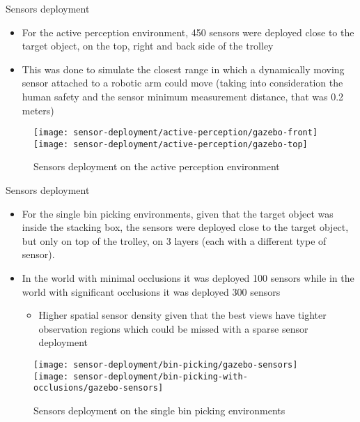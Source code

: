 \begin{frame}{Sensors deployment}
	\begin{itemize}
		\item For the active perception environment, 450 sensors were deployed close to the target object, on the top, right and back side of the trolley
		\item This was done to simulate the closest range in which a dynamically moving sensor attached to a robotic arm could move (taking into consideration the human safety and the sensor minimum measurement distance, that was 0.2 meters)
	\end{itemize}
	\begin{figure}
		\centering
		\texttt{[image: sensor-deployment/active-perception/gazebo-front]}
		\texttt{[image: sensor-deployment/active-perception/gazebo-top]}
		\caption{Sensors deployment on the active perception environment}
	\end{figure}
\end{frame}

\begin{frame}{Sensors deployment}
	\begin{itemize}
		\item For the single bin picking environments, given that the target object was inside the stacking box, the sensors were deployed close to the target object, but only on top of the trolley, on 3 layers (each with a different type of sensor).
		\item In the world with minimal occlusions it was deployed 100 sensors while in the world with significant occlusions it was deployed 300 sensors
			\begin{itemize}
				\item Higher spatial sensor density given that the best views have tighter observation regions which could be missed with a sparse sensor deployment
			\end{itemize}
	\end{itemize}
	\begin{figure}
		\centering
		\texttt{[image: sensor-deployment/bin-picking/gazebo-sensors]}
		\texttt{[image: sensor-deployment/bin-picking-with-occlusions/gazebo-sensors]}
		\caption{Sensors deployment on the single bin picking environments}
	\end{figure}
\end{frame}

